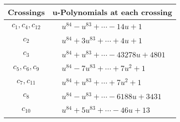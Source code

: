 \documentclass[1p]{elsarticle_modified}
\theoremstyle{definition}
\begin{document}
\begin{tabular}{m{50pt}|m{274pt}}
Crossings & \hspace{64pt}u-Polynomials at each crossing \\
\hline $$\begin{aligned}c_{1},c_{4},c_{12}\end{aligned}$$&$\begin{aligned}
&u^{84}- u^{83}+\cdots-14 u+1
\end{aligned}$\\
\hline $$\begin{aligned}c_{2}\end{aligned}$$&$\begin{aligned}
&u^{84}+3 u^{83}+\cdots+4 u+1
\end{aligned}$\\
\hline $$\begin{aligned}c_{3}\end{aligned}$$&$\begin{aligned}
&u^{84}+u^{83}+\cdots-43278 u+4801
\end{aligned}$\\
\hline $$\begin{aligned}c_{5},c_{6},c_{9}\end{aligned}$$&$\begin{aligned}
&u^{84}-7 u^{83}+\cdots+7 u^2+1
\end{aligned}$\\
\hline $$\begin{aligned}c_{7},c_{11}\end{aligned}$$&$\begin{aligned}
&u^{84}+u^{83}+\cdots+7 u^2+1
\end{aligned}$\\
\hline $$\begin{aligned}c_{8}\end{aligned}$$&$\begin{aligned}
&u^{84}- u^{83}+\cdots-6188 u+3431
\end{aligned}$\\
\hline $$\begin{aligned}c_{10}\end{aligned}$$&$\begin{aligned}
&u^{84}+5 u^{83}+\cdots-46 u+13
\end{aligned}$\\
\hline
\end{tabular}\\~\\
\newpage\renewcommand{\arraystretch}{1}
\end{document}
